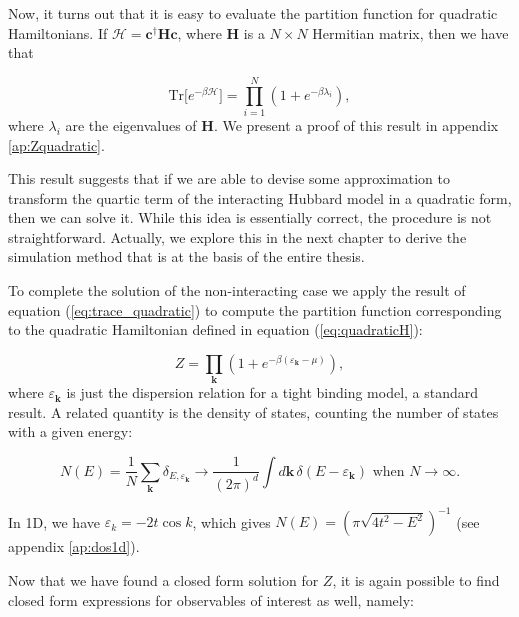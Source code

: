 Now, it turns out that it is easy to evaluate the partition function for quadratic Hamiltonians. If $\mathcal{H} = \bm c^\dagger \bm H \bm c$, where $\bm H$ is a $N \times N$ Hermitian matrix, then we have that

\begin{equation}\label{eq:trace_quadratic}
\text{Tr} \big[ e^{-\beta \mathcal{H} } \big] = \prod_{i=1}^N ( 1 + e^{-\beta \lambda_i } ) ,
\end{equation}
where $\lambda_i$ are the eigenvalues of $\bm H$. We present a proof of this result in appendix \ref{ap:Zquadratic}.

This result suggests that if we are able to devise some approximation to transform the quartic term of the interacting Hubbard model in a quadratic form, then we can solve it.
While this idea is essentially correct, the procedure is not straightforward.
Actually, we explore this in the next chapter to derive the simulation method that is at the basis of the entire thesis.

To complete the solution of the non-interacting case we apply the result of equation (\ref{eq:trace_quadratic}) to compute the partition function corresponding to the quadratic Hamiltonian defined in equation (\ref{eq:quadraticH}):

\begin{equation}
Z = \prod_{\bm k} ( 1 + e^{-\beta (\varepsilon_{\bm k} - \mu )} ) ,
\end{equation}
where $\varepsilon_{\bm k}$ is just the dispersion relation for a tight binding model, a standard result.
A related quantity is the density of states, counting the number of states with a given energy:

\begin{equation}
N ( E ) = \frac{1}{N} \sum_{\bm k} \delta_{E,\varepsilon_{\bm k}} \rightarrow \frac{1}{(2\pi)^d} \int d\bm k \, \delta ( E - \varepsilon_{\bm k})\,\, \text{when}\,\, N\rightarrow \infty.
\end{equation}

In \acs{1D}, we have $\varepsilon_{k} = - 2 t \cos k$, which gives $N(E) = ( \pi \sqrt{ 4 t^2 - E^2 } )^{-1}$ (see appendix \ref{ap:dos1d}).

Now that we have found a closed form solution for $Z$, it is again possible to find closed form expressions for observables of interest as well, namely:

